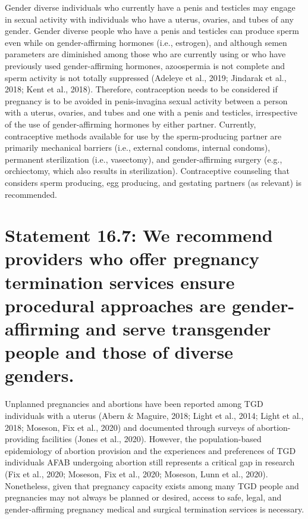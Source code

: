 \documentclass[
]{book}
\begin{document}
Gender diverse individuals who currently have
a penis and testicles may engage in sexual activity
with individuals who have a uterus, ovaries, and
tubes of any gender. Gender diverse people who
have a penis and testicles can produce sperm
even while on gender-affirming hormones (i.e.,
estrogen), and although semen parameters are
diminished among those who are currently using
or who have previously used gender-affirming
hormones, azoospermia is not complete and
sperm activity is not totally suppressed (Adeleye
et al., 2019; Jindarak et al., 2018; Kent et al.,
2018). Therefore, contraception needs to be considered if pregnancy is to be avoided in penis-invagina sexual activity between a person with a
uterus, ovaries, and tubes and one with a penis
and testicles, irrespective of the use of
gender-affirming hormones by either partner.
Currently, contraceptive methods available for use
by the sperm-producing partner are primarily
mechanical barriers (i.e., external condoms, internal condoms), permanent sterilization (i.e., vasectomy), and gender-affirming surgery (e.g.,
orchiectomy, which also results in sterilization).
Contraceptive counseling that considers sperm
producing, egg producing, and gestating partners
(as relevant) is recommended.

\hypertarget{statement-16.7-we-recommend-providers-who-offer-pregnancy-termination-services-ensure-procedural-approaches-are-gender-affirming-and-serve-transgender-people-and-those-of-diverse-genders.}{%
\section*{Statement 16.7: We recommend providers who offer pregnancy termination services ensure procedural approaches are gender-affirming and serve transgender people and those of diverse genders.}\label{statement-16.7-we-recommend-providers-who-offer-pregnancy-termination-services-ensure-procedural-approaches-are-gender-affirming-and-serve-transgender-people-and-those-of-diverse-genders.}}

Unplanned pregnancies and abortions have
been reported among TGD individuals with a
uterus (Abern \& Maguire, 2018; Light et al., 2014;
Light et al., 2018; Moseson, Fix et al., 2020) and
documented through surveys of abortion-providing
facilities (Jones et al., 2020). However, the
population-based epidemiology of abortion provision and the experiences and preferences of
TGD individuals AFAB undergoing abortion still
represents a critical gap in research (Fix et al.,
2020; Moseson, Fix et al., 2020; Moseson, Lunn
et al., 2020). Nonetheless, given that pregnancy
capacity exists among many TGD people and
pregnancies may not always be planned or
desired, access to safe, legal, and gender-affirming
pregnancy medical and surgical termination services is necessary.
\end{document}

